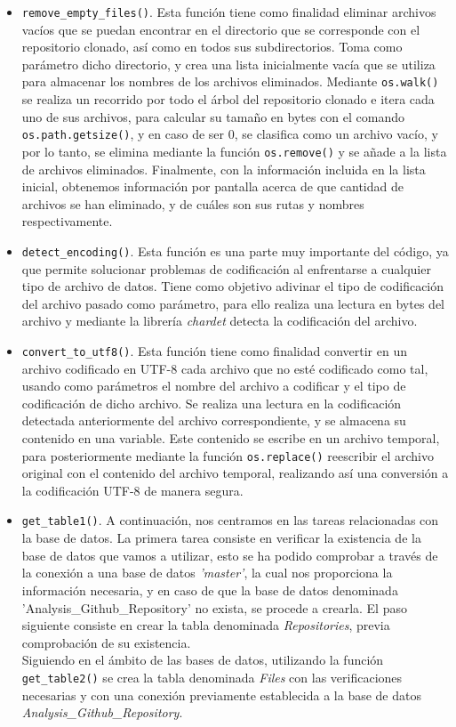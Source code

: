 \documentclass[a4paper, 12pt]{book}
\begin{document}
\begin{itemize}
  \item \texttt{remove\_empty\_files()}. Esta función tiene como finalidad eliminar archivos vacíos que se puedan encontrar en el directorio que se corresponde con el repositorio clonado, así como en todos sus subdirectorios.
  Toma como parámetro dicho directorio, y crea una lista inicialmente vacía que se utiliza para almacenar los nombres de los archivos eliminados. Mediante \texttt{os.walk()} se realiza un recorrido por todo el árbol del repositorio
  clonado e itera cada uno de sus archivos, para calcular su tamaño en bytes con el comando \texttt{os.path.getsize()}, y en caso de ser 0, se clasifica como un archivo vacío, y por lo tanto, se elimina mediante la función \texttt{os.remove()}
  y se añade a la lista de archivos eliminados. Finalmente, con la información incluida en la lista inicial, obtenemos información por pantalla acerca de que cantidad de archivos se han eliminado, y de cuáles son sus rutas y nombres respectivamente.
  
  \item \texttt{detect\_encoding()}. Esta función es una parte muy importante del código, ya que permite solucionar problemas de codificación al enfrentarse a cualquier tipo de archivo de datos. Tiene como objetivo adivinar el tipo de
  codificación del archivo pasado como parámetro, para ello realiza una lectura en bytes del archivo y mediante la librería \textit{chardet} detecta la codificación del archivo.
  
  \item \texttt{convert\_to\_utf8()}. Esta función tiene como finalidad convertir en un archivo codificado en UTF-8 cada archivo que no esté codificado como tal, usando como parámetros el nombre del archivo a codificar y el tipo de codificación de dicho archivo.
  Se realiza una lectura en la codificación detectada anteriormente del archivo correspondiente, y se almacena su contenido en una variable. Este contenido se escribe en un archivo temporal, para posteriormente mediante la función \texttt{os.replace()}
  reescribir el archivo original con el contenido del archivo temporal, realizando así una conversión a la codificación UTF-8 de manera segura. 

  \item \texttt{get\_table1()}. A continuación, nos centramos en las tareas relacionadas con la base de datos. La primera tarea consiste en verificar la existencia de la base de datos que vamos a utilizar, esto se ha podido comprobar a través de la conexión a una base de datos
  \textit{'master'}, la cual nos proporciona la información necesaria, y en caso de que la base de datos denominada 'Analysis\_Github\_Repository' no exista, se procede a crearla. El paso siguiente consiste en crear la tabla denominada \textit{Repositories}, previa comprobación de su existencia.
  \\Siguiendo en el ámbito de las bases de datos, utilizando la función \texttt{get\_table2()} se crea la tabla denominada \textit{Files} con las verificaciones necesarias y con una conexión previamente establecida a la base de datos \textit{Analysis\_Github\_Repository}.


\end{itemize}
\end{document}
